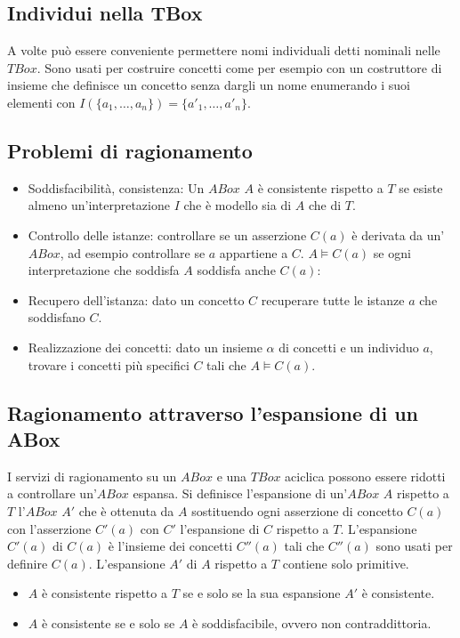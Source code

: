 \subsection{Individui nella TBox}
A volte pu\`o essere conveniente permettere nomi individuali detti nominali nelle $TBox$. Sono usati per costruire concetti come per esempio con un costruttore di insieme che definisce un concetto senza 
dargli un nome enumerando i suoi elementi con $I(\{a_1,\dots,a_n\})=\{a'_1,\dots,a'_n\}$.
\subsection{Problemi di ragionamento}
\begin{itemize}
\item Soddisfacibilit\`a, consistenza: Un $ABox$ $A$ \`e consistente rispetto a $T$ se esiste almeno un'interpretazione $I$ che \`e modello sia di $A$ che di $T$.
\item Controllo delle istanze: controllare se un asserzione $C(a)$ \`e derivata da un'$ABox$, ad esempio controllare se $a$ appartiene a $C$. $A\models C(a)$ se ogni interpretazione che soddisfa $A$ 
soddisfa anche $C(a)$:
\item Recupero dell'istanza: dato un concetto $C$ recuperare tutte le istanze $a$ che soddisfano $C$.
\item Realizzazione dei concetti: dato un insieme $\alpha$ di concetti e un individuo $a$, trovare i concetti pi\`u specifici $C$ tali che $A\models C(a)$.
\end{itemize}
\subsection{Ragionamento attraverso l'espansione di un ABox}
I servizi di ragionamento su un $ABox$ e una $TBox$ aciclica possono essere ridotti a controllare un'$ABox$ espansa. Si definisce l'espansione di un'$ABox$ $A$ rispetto a $T$ l'$ABox$ $A'$ che \`e 
ottenuta da $A$ sostituendo ogni asserzione di concetto $C(a)$ con l'asserzione $C'(a)$ con $C'$ l'espansione di $C$ rispetto a $T$. L'espansione $C'(a)$ di $C(a)$ \`e l'insieme dei concetti $C''(a)$ tali che
$C''(a)$ sono usati per definire $C(a)$. L'espansione $A'$ di $A$ rispetto a $T$ contiene solo primitive.
\begin{itemize}
\item $A$ \`e consistente rispetto a $T$ se e solo se la sua espansione $A'$ \`e consistente.
\item $A$ \`e consistente se e solo se $A$ \`e soddisfacibile, ovvero non contraddittoria.
\end{itemize}
